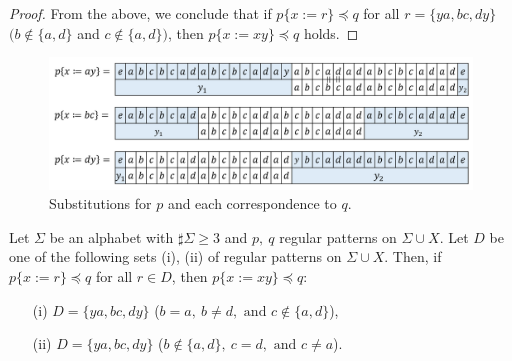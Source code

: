 \begin{proof}
  \smallskip
  
  From the above, we conclude that if $p \{ x := r \} \preceq q$ for all $r = \{ ya, bc, dy \}$ $(b \not\in \{a,d\}$ and $c \not\in \{a,d\})$, then $p \{ x := xy \} \preceq q$ holds.
  \end{proof}

\begin{figure}[t]
  \begin{center}
  \includegraphics[scale=0.45]{figs/Exam_b=a_c=d.png}
  \end{center}
  \caption{Substitutions for $p$ and each correspondence to $q$.}
  \label{b=aとc=dの例}
\end{figure}

\begin{lem}\label{片方}
Let $\Sigma$ be an alphabet with $\sharp\Sigma \ge 3$ and $p,~q$ regular patterns on $\Sigma\cup X$.
Let $D$ be one of the following sets \textrm{(i), (ii)} of regular patterns on $\Sigma\cup X$.
Then, if $p \{ x := r \} \preceq q$ for all $r \in D$, then $p \{ x := xy \} \preceq q$:
\begin{enumerate}
\item[{\rm (i)}] $D=\{ ya, bc, dy \}$ ($b = a,~b \not= d,\mbox{~and~}c \not\in \{a,d\}$),
\item[{\rm (ii)}] $D=\{ ya, bc, dy \}$ ($b \not\in \{a,d\},~c = d,\mbox{~and~} c \not = a$).
\end{enumerate}
\end{lem}

